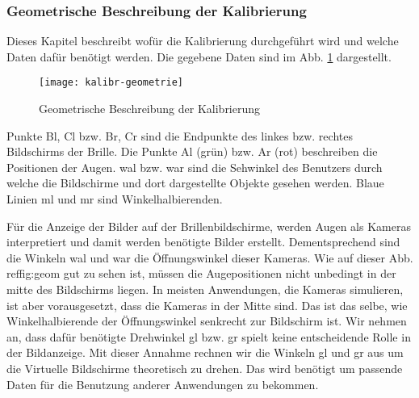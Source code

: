 \subsubsection{Geometrische Beschreibung der Kalibrierung}
Dieses Kapitel beschreibt wofür die Kalibrierung durchgeführt wird und welche Daten dafür benötigt werden.
Die gegebene Daten sind im Abb. \ref{fig:geom} dargestellt. 

\begin{figure}[h]
   \centering
   \texttt{[image: kalibr-geometrie]}
   \caption{Geometrische Beschreibung der Kalibrierung}
   \label{fig:geom}
\end{figure}

Punkte Bl, Cl bzw. Br, Cr sind die Endpunkte des linkes bzw. rechtes Bildschirms der Brille.
Die Punkte Al (grün) bzw. Ar (rot) beschreiben die Positionen der Augen.
wal bzw. war sind die Sehwinkel des Benutzers durch welche die Bildschirme und dort dargestellte Objekte gesehen werden. 
Blaue Linien ml und mr sind Winkelhalbierenden.

Für die Anzeige der Bilder auf der Brillenbildschirme, werden Augen als Kameras interpretiert und damit werden benötigte Bilder erstellt.
Dementsprechend sind die Winkeln wal und war die Öffnungswinkel dieser Kameras.
Wie auf dieser Abb. ref{fig:geom} gut zu sehen ist, müssen die Augepositionen nicht unbedingt in der mitte des Bildschirms liegen.
In meisten Anwendungen, die Kameras simulieren, ist aber vorausgesetzt, dass die Kameras in der Mitte sind.
Das ist das selbe, wie Winkelhalbierende der Öffnungswinkel senkrecht zur Bildschirm ist.
Wir nehmen an, dass dafür benötigte Drehwinkel gl bzw. gr spielt keine entscheidende Rolle in der Bildanzeige.
Mit dieser Annahme rechnen wir die Winkeln gl und gr aus  um die Virtuelle Bildschirme theoretisch zu drehen.
Das wird benötigt um passende Daten für die Benutzung anderer Anwendungen zu bekommen.



